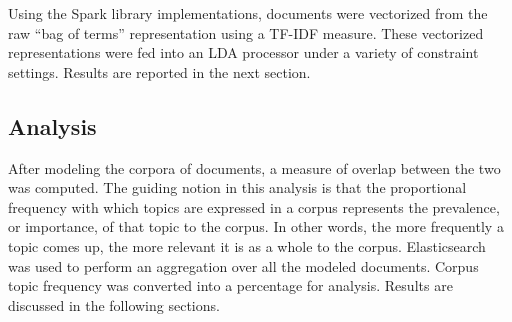 Using the Spark library implementations, documents were vectorized from the raw ``bag of terms'' representation using a TF-IDF measure.
These vectorized representations were fed into an LDA processor under a variety of constraint settings.
Results are reported in the next section.

\subsection{Analysis}

After modeling the corpora of documents, a measure of overlap between the two was computed.
The guiding notion in this analysis is that the proportional frequency with which topics are expressed in a corpus represents the prevalence, or importance, of that topic to the corpus.
In other words, the more frequently a topic comes up, the more relevant it is as a whole to the corpus.
Elasticsearch was used to perform an aggregation over all the modeled documents.
Corpus topic frequency was converted into a percentage for analysis.
Results are discussed in the following sections.

